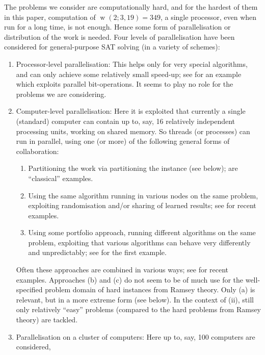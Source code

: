 \documentclass[final,3p,times]{elsarticle}
\theoremstyle{definition}
\DeclareMathOperator{\vdw}{w}
\begin{document}
The problems we consider are computationally hard, and for the hardest of them in this paper, computation of $\vdw(2; 3, 19) = 349$, a single processor, even when run for a long time,
is not enough. Hence some form of parallelisation or distribution of the work is needed.
Four levels of parallelisation have been considered for general-purpose SAT solving (in a variety of schemes):
\begin{enumerate}
\item[(i)] Processor-level parallelisation: This helps only for very special algorithms,
and can only achieve some relatively small speed-up; see \cite{HeuleMaaren2008Parallel} for an
example which exploits parallel bit-operations. It seems to play no role for the problems we are considering.
\item[(ii)] Computer-level parallelisation: Here it is exploited that currently a single (standard)
computer can contain up to, say, 16 relatively independent processing units, working on shared memory.
So threads (or processes) can run in parallel, using one (or more) of the following general forms of collaboration:
  \begin{enumerate}
  \item[(a)] Partitioning the work via partitioning the instance (see below); \cite{ZBH96,JurkowiakLiUtard2005PSatz} are ``classical'' examples.
  \item[(b)] Using the same algorithm running in various nodes on the same problem,
exploiting randomisation and/or sharing of learned results; see
\cite{HyvaerinenJunttilaNiemelae2009ClauseLearning,GuoHamadiJabbourSais2010DiversificationIntensification} for recent examples.
  \item[(c)] Using some portfolio approach, running different algorithms on the same problem,
exploiting that various algorithms can behave very differently and unpredictably; see \cite{Gu1999} for the first example.
  \end{enumerate}
  Often these approaches are combined in various ways; see
\cite{SchubertLewisBecker2009PaMiraXT, GilFloresSilveira2009PMSat, HyvaerinenJunttilaNiemelae2009PartitioningSearchSpaces, HyvaerinenJunttilaNiemelae2010PartitioningInstances}
for recent examples. Approaches (b) and (c) do not seem to be of much use for the well-specified problem domain of hard instances from Ramsey theory.
Only (a) is relevant, but in a more extreme form (see below). In the context of (ii), still only relatively ``easy'' problems (compared to the hard problems from Ramsey theory) are tackled.
\item[(iii)] Parallelisation on a cluster of computers: Here up to, say, 100 computers are considered,

\end{enumerate}
\end{document}
